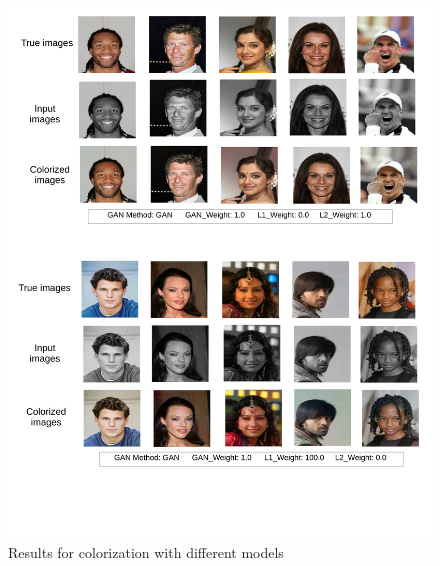 \documentclass[11pt]{article}
\begin{document}
\begin{figure}[t]
\vspace{-10mm}
\hspace{-25mm}
\includegraphics [scale=0.32]{1.pdf}
\vspace{-26mm}
\caption{Results for colorization with different models}
\label{fig:1}
\end{figure}
\end{document}
